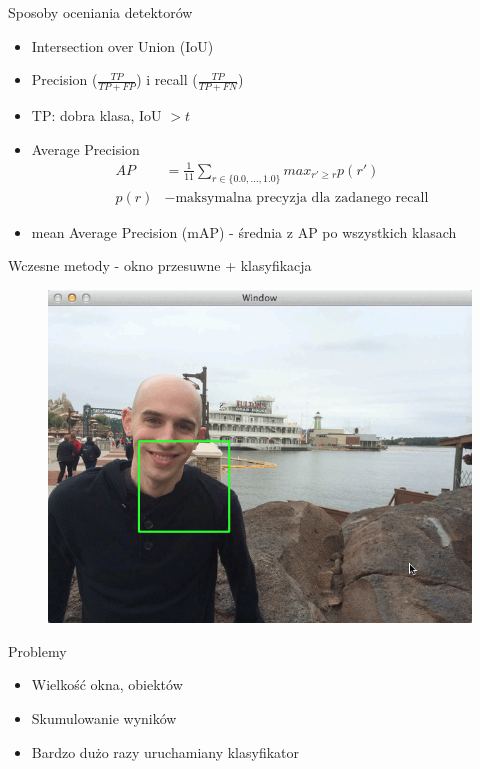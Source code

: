 \documentclass[11pt]{beamer}
\begin{document}
\begin{frame}{Sposoby oceniania detektorów}

\begin{itemize}
    \item Intersection over Union (IoU)
    \item Precision ($\frac{TP}{TP+FP}$) i recall ($\frac{TP}{TP+FN}$)
    \item TP: dobra klasa, IoU $ > t$
    \item Average Precision 
    \begin{align*}
        AP &= \frac{1}{11} \sum_{r \in \{0.0, \ldots, 1.0\}} max_{r' \geq r} p(r') \\ p(r) &- \text{maksymalna precyzja dla zadanego recall}
    \end{align*} 
    \item mean Average Precision (mAP) - średnia z AP po wszystkich klasach
\end{itemize}
\end{frame}

\begin{frame}{Wczesne metody - okno przesuwne + klasyfikacja}
\begin{figure}
    \includegraphics[height=0.5\textheight]{grafika/sliding.png}
\end{figure}
\begin{alertblock}{Problemy}
\begin{itemize}
    \item Wielkość okna, obiektów
    \item Skumulowanie wyników
    \item Bardzo dużo razy uruchamiany klasyfikator
\end{itemize}
\end{alertblock}
\end{frame}
\end{document}

